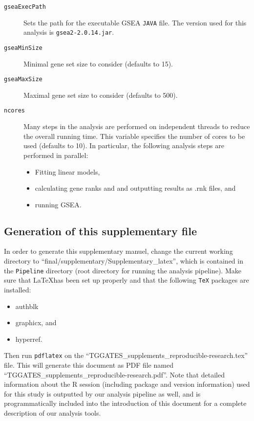 \documentclass[a4paper,10pt]{scrartcl}
\begin{document}
\begin{description}
 \item[\texttt{gseaExecPath}] Sets the path for the executable GSEA \verb+JAVA+ file. The version used for this analysis is \verb+gsea2-2.0.14.jar+.
 \item[\texttt{gseaMinSize}] Minimal gene set size to consider (defaults to 15).
 \item[\texttt{gseaMaxSize}] Maximal gene set size to consider (defaults to 500).
 \item[\texttt{ncores}] Many steps in the analysis are performed on independent threads to reduce the overall running time. This variable specifies the number of cores to be used (defaults to 10). In particular, the following analysis steps are performed in parallel:
  \begin{itemize}
   \item Fitting linear models,
   \item calculating gene ranks and and outputting results as .rnk files, and
   \item running GSEA.
  \end{itemize}
\end{description}

\subsection{Generation of this supplementary file}

In order to generate this supplementary manuel, change the current working directory to ``final/supplementary/Supplementary\_latex'', which is contained in the \verb+Pipeline+ directory (root directory for running the analysis pipeline). Make sure that \LaTeX has been set up properly and that the following \verb+TeX+ packages are installed:

\begin{itemize}
 \item authblk %
 \item graphicx, and %
 \item hyperref. %
\end{itemize}

Then run \verb+pdflatex+ on the ``TGGATES\_supplements\_reproducible-research.tex'' file. This will generate this document as PDF file named ``TGGATES\_supplements\_reproducible-research.pdf''. Note that detailed information about the R session (including package and version information) used for this study is outputted by our analysis pipeline as well, and is programmatically included into the introduction of this document for a complete description of our analysis tools.
\end{document}
